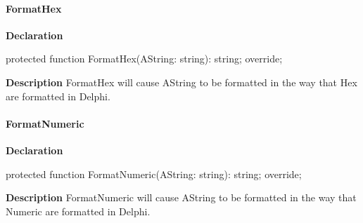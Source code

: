\documentclass{report}
\newif\ifpdf
\begin{document}
\paragraph*{FormatHex}\hspace*{\fill}

\label{PasDoc_GenHtml.TGenericHTMLDocGenerator-FormatHex}
\begin{list}{}{
\setlength{\itemindent}{0cm}
\setlength{\listparindent}{0cm}
\setlength{\leftmargin}{\evensidemargin}
\addtolength{\leftmargin}{\tmplength}
\settowidth{\labelsep}{X}
\addtolength{\leftmargin}{\labelsep}
\setlength{\labelwidth}{\tmplength}
}
\item[\textbf{Declaration}\hfill]
\ifpdf
\begin{flushleft}
\fi
\begin{ttfamily}
protected function FormatHex(AString: string): string; override;\end{ttfamily}

\ifpdf
\end{flushleft}
\fi

\par
\item[\textbf{Description}]
FormatHex will cause AString to be formatted in the way that Hex are formatted in Delphi.

\end{list}
\paragraph*{FormatNumeric}\hspace*{\fill}

\label{PasDoc_GenHtml.TGenericHTMLDocGenerator-FormatNumeric}
\begin{list}{}{
\setlength{\itemindent}{0cm}
\setlength{\listparindent}{0cm}
\setlength{\leftmargin}{\evensidemargin}
\addtolength{\leftmargin}{\tmplength}
\settowidth{\labelsep}{X}
\addtolength{\leftmargin}{\labelsep}
\setlength{\labelwidth}{\tmplength}
}
\item[\textbf{Declaration}\hfill]
\ifpdf
\begin{flushleft}
\fi
\begin{ttfamily}
protected function FormatNumeric(AString: string): string; override;\end{ttfamily}

\ifpdf
\end{flushleft}
\fi

\par
\item[\textbf{Description}]
FormatNumeric will cause AString to be formatted in the way that Numeric are formatted in Delphi.

\end{list}
\end{document}
